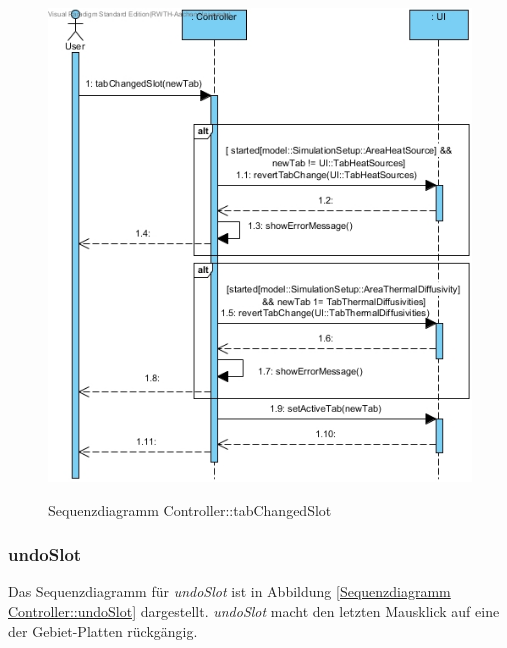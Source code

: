 \begin{figure}[H]
	\centering
	\includegraphics[scale=.6]{Bilder/Controller__tabChangedSlot().jpg}\\
	\caption{Sequenzdiagramm Controller::tabChangedSlot}
	\label{Sequenzdiagramm Controller::tabChangedSlot}
\end{figure}

\subsubsection*{undoSlot}

Das Sequenzdiagramm für \emph{undoSlot} ist in Abbildung \ref{Sequenzdiagramm Controller::undoSlot} dargestellt. \emph{undoSlot} macht den letzten Mausklick auf eine der Gebiet-Platten rückgängig.

